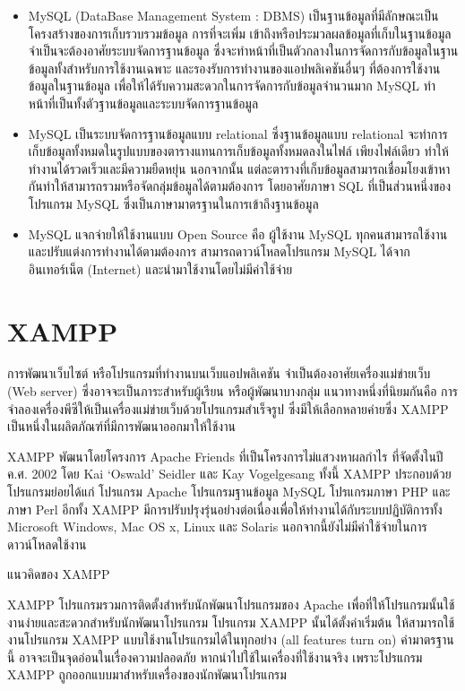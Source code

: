 		\begin{itemize}
			\item{MySQL (DataBase Management System : DBMS) 
				เป็นฐานข้อมูลที่มีลักษณะเป็นโครงสร้างของการเก็บรวบรวมข้อมูล การที่จะเพิ่ม เข้าถึงหรือประมวลผลข้อมูลที่เก็บในฐานข้อมูลจำเป็นจะต้องอาศัยระบบจัดการฐานข้อมูล ซึ่งจะทำหน้าที่เป็นตัวกลางในการจัดการกับข้อมูลในฐานข้อมูลทั้งสำหรับการใช้งานเฉพาะ และรองรับการทำงานของแอปพลิเคชันอื่นๆ ที่ต้องการใช้งานข้อมูลในฐานข้อมูล เพื่อให้ได้รับความสะดวกในการจัดการกับข้อมูลจำนวนมาก MySQL ทำหน้าที่เป็นทั้งตัวฐานข้อมูลและระบบจัดการฐานข้อมูล}
			\item{MySQL เป็นระบบจัดการฐานข้อมูลแบบ relational 
				ซึ่งฐานข้อมูลแบบ relational จะทำการเก็บข้อมูลทั้งหมดในรูปแบบของตารางแทนการเก็บข้อมูลทั้งหมดลงในไฟล์ เพียงไฟล์เดียว ทำให้ทำงานได้รวดเร็วและมีความยืดหยุ่น นอกจากนั้น แต่ละตารางที่เก็บข้อมูลสามารถเชื่อมโยงเข้าหากันทำให้สามารถรวมหรือจัดกลุ่มข้อมูลได้ตามต้องการ โดยอาศัยภาษา SQL ที่เป็นส่วนหนึ่งของโปรแกรม MySQL ซึ่งเป็นภาษามาตรฐานในการเข้าถึงฐานข้อมูล}
			\item{MySQL แจกจ่ายให้ใช้งานแบบ Open Source คือ ผู้ใช้งาน MySQL ทุกคนสามารถใช้งานและปรับแต่งการทำงานได้ตามต้องการ สามารถดาวน์โหลดโปรแกรม MySQL ได้จากอินเทอร์เน็ต (Internet) และนำมาใช้งานโดยไม่มีค่าใช้จ่าย}
		\end{itemize}
		
		\section{XAMPP}
		การพัฒนาเว็บไซต์ หรือโปรแกรมที่ทำงานบนเว็บแอปพลิเคชัน จำเป็นต้องอาศัยเครื่องแม่ข่ายเว็บ (Web server) ซึ่งอาจจะเป็นภาระสำหรับผู้เรียน หรือผู้พัฒนาบางกลุ่ม แนวทางหนึ่งที่นิยมกันคือ การจำลองเครื่องพีซีให้เป็นเครื่องแม่ข่ายเว็บด้วยโปรแกรมสำเร็จรูป ซึ่งมีให้เลือกหลายค่ายซึ่ง
		XAMPP เป็นหนึ่งในผลิตภัณฑ์ที่มีการพัฒนาออกมาให้ใช้งาน
		
		XAMPP  พัฒนาโดยโครงการ Apache Friends ที่เป็นโครงการไม่แสวงหาผลกำไร ที่จัดตั้งในปี ค.ศ. 2002 โดย Kai ‘Oswald’ Seidler และ Kay Vogelgesang ทั้งนี้ XAMPP ประกอบด้วยโปรแกรมย่อยได้แก่ โปรแกรม Apache โปรแกรมฐานข้อมูล MySQL โปรแกรมภาษา PHP และภาษา Perl อีกทั้ง XAMPP มีการปรับปรุงรุ่นอย่างต่อเนื่องเพื่อให้ทำงานได้กับระบบปฏิบัติการทั้ง Microsoft Windows, Mac OS x, Linux และ Solaris นอกจากนี้ยังไม่มีค่าใช้จ่ายในการดาวน์โหลดใช้งาน
		
		แนวคิดของ XAMPP
		
		XAMPP โปรแกรมรวมการติดตั้งสำหรับนักพัฒนาโปรแกรมของ Apache เพื่อที่ให้โปรแกรมนั้นใช้งานง่ายและสะดวกสำหรับนักพัฒนาโปรแกรม โปรแกรม XAMPP นั้นได้ตั้งค่าเริ่มต้น ให้สามารถใช้งานโปรแกรม XAMPP แบบใช้งานโปรแกรมได้ในทุกอย่าง (all features turn on)
		ค่ามาตรฐานนี้ อาจจะเป็นจุดอ่อนในเรื่องความปลอดภัย หากนำไปใช้ในเครื่องที่ใช้งานจริง เพราะโปรแกรม XAMPP ถูกออกแบบมาสำหรับเครื่องของนักพัฒนาโปรแกรม
		
